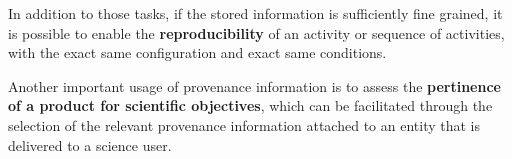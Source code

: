 
In addition to those tasks, if the stored information is sufficiently fine grained, it is possible to enable the \textbf{reproducibility} of an activity or sequence of activities, with the exact same configuration and exact same conditions.

Another important usage of provenance information is to assess the \textbf{pertinence of a product for scientific objectives}, which can be facilitated through the selection of the relevant provenance information attached to an entity that is delivered to a science user.
